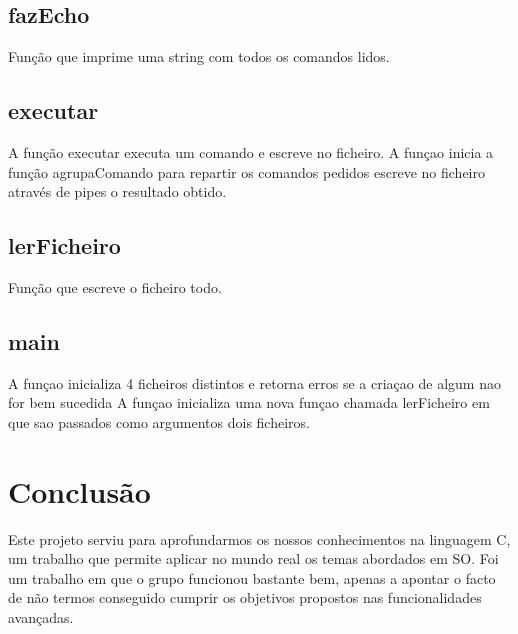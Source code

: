\documentclass[a4paper]{article}
\begin{document}
\subsection{fazEcho}
Função que imprime uma string com todos os comandos lidos.


\subsection{executar}
A função executar executa um comando e escreve no ficheiro.
A funçao inicia a função agrupaComando para repartir os comandos pedidos escreve no ficheiro através de pipes o resultado obtido.



\subsection{lerFicheiro}
Função que escreve o ficheiro todo.

\subsection{main}
A funçao inicializa 4 ficheiros distintos e retorna erros se a criaçao de algum nao for bem sucedida
A funçao inicializa uma nova funçao chamada lerFicheiro em que sao passados como argumentos dois ficheiros.

\section{Conclusão}
\label{sec:conclusao}
Este projeto serviu para aprofundarmos os nossos conhecimentos na linguagem C, um trabalho que permite aplicar no mundo real os temas abordados em SO.
Foi um trabalho em que o grupo funcionou bastante bem, apenas a apontar o facto de não termos conseguido cumprir os objetivos propostos nas funcionalidades avançadas.
\end{document}
